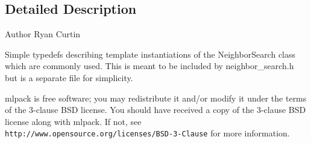 \subsection{Detailed Description}
\begin{DoxyAuthor}{Author}
Ryan Curtin
\end{DoxyAuthor}
Simple typedefs describing template instantiations of the Neighbor\+Search class which are commonly used. This is meant to be included by neighbor\+\_\+search.\+h but is a separate file for simplicity.

mlpack is free software; you may redistribute it and/or modify it under the terms of the 3-\/clause B\+SD license. You should have received a copy of the 3-\/clause B\+SD license along with mlpack. If not, see {\tt http\+://www.\+opensource.\+org/licenses/\+B\+S\+D-\/3-\/\+Clause} for more information. 